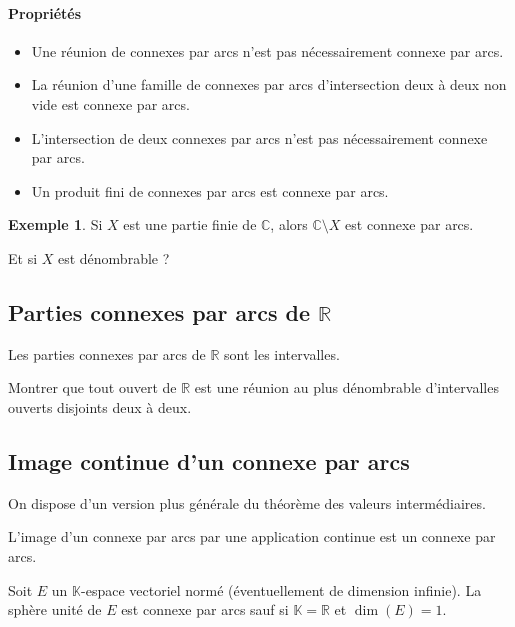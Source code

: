 \documentclass[french]{article}
\newcommand{\R}{\mathbb{R}}
\newcommand{\C}{\mathbb{C}}
\newcommand{\K}{\mathbb{K}}
\theoremstyle{plain}
\theoremstyle{definition}
\newtheorem*{ex}{Exemple}
\theoremstyle{remark}
\begin{document}
\paragraph{Propriétés}
\begin{itemize}
	\item Une réunion de connexes par arcs n'est pas nécessairement connexe par arcs.
	\item La réunion d'une famille de connexes par arcs d'intersection deux à deux non vide est connexe par arcs.
	\item L'intersection de deux connexes par arcs n'est pas nécessairement connexe par arcs.
	\item Un produit fini de connexes par arcs est connexe par arcs. 
\end{itemize}

\begin{ex}
	Si $X$ est une partie finie de $\C$, alors $\C\setminus X$ est connexe par arcs.
\end{ex}

\begin{exo}
	Et si $X$ est dénombrable ?
\end{exo}

\subsection{Parties connexes par arcs de $\R$}

\begin{prop}%
	Les parties connexes par arcs de $\R$ sont les intervalles.
\end{prop}

\begin{exo}
	Montrer que tout ouvert de $\R$ est une réunion au plus dénombrable d'intervalles ouverts disjoints deux à deux.
\end{exo}

\subsection{Image continue d'un connexe par arcs}

On dispose d'un version plus générale du théorème des valeurs intermédiaires.

\begin{prop}%
	L'image d'un connexe par arcs par une application continue est un connexe par arcs.
\end{prop}

\begin{exo}
	Soit $E$ un $\K$-espace vectoriel normé (éventuellement de dimension infinie). La sphère unité de $E$ est connexe par arcs sauf si $\K=\R$ et $\dim(E)=1$.
\end{exo}
\end{document}

